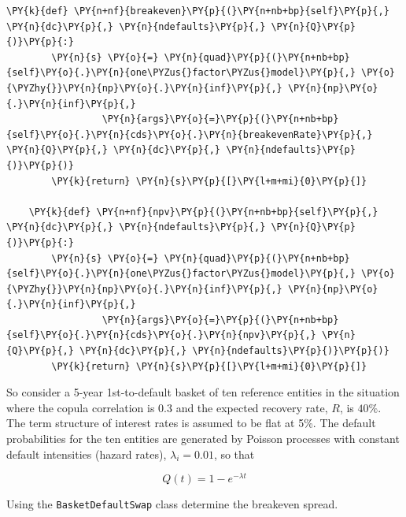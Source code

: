 \begin{tcolorbox}[breakable, size=fbox, boxrule=1pt, pad at break*=1mm,colback=cellbackground, colframe=cellborder]
\begin{Verbatim}[commandchars=\\\{\}]
    \PY{k}{def} \PY{n+nf}{breakeven}\PY{p}{(}\PY{n+nb+bp}{self}\PY{p}{,} \PY{n}{dc}\PY{p}{,} \PY{n}{ndefaults}\PY{p}{,} \PY{n}{Q}\PY{p}{)}\PY{p}{:}
        \PY{n}{s} \PY{o}{=} \PY{n}{quad}\PY{p}{(}\PY{n+nb+bp}{self}\PY{o}{.}\PY{n}{one\PYZus{}factor\PYZus{}model}\PY{p}{,} \PY{o}{\PYZhy{}}\PY{n}{np}\PY{o}{.}\PY{n}{inf}\PY{p}{,} \PY{n}{np}\PY{o}{.}\PY{n}{inf}\PY{p}{,} 
                 \PY{n}{args}\PY{o}{=}\PY{p}{(}\PY{n+nb+bp}{self}\PY{o}{.}\PY{n}{cds}\PY{o}{.}\PY{n}{breakevenRate}\PY{p}{,} \PY{n}{Q}\PY{p}{,} \PY{n}{dc}\PY{p}{,} \PY{n}{ndefaults}\PY{p}{)}\PY{p}{)}
        \PY{k}{return} \PY{n}{s}\PY{p}{[}\PY{l+m+mi}{0}\PY{p}{]}
		
    \PY{k}{def} \PY{n+nf}{npv}\PY{p}{(}\PY{n+nb+bp}{self}\PY{p}{,} \PY{n}{dc}\PY{p}{,} \PY{n}{ndefaults}\PY{p}{,} \PY{n}{Q}\PY{p}{)}\PY{p}{:}
        \PY{n}{s} \PY{o}{=} \PY{n}{quad}\PY{p}{(}\PY{n+nb+bp}{self}\PY{o}{.}\PY{n}{one\PYZus{}factor\PYZus{}model}\PY{p}{,} \PY{o}{\PYZhy{}}\PY{n}{np}\PY{o}{.}\PY{n}{inf}\PY{p}{,} \PY{n}{np}\PY{o}{.}\PY{n}{inf}\PY{p}{,} 
                 \PY{n}{args}\PY{o}{=}\PY{p}{(}\PY{n+nb+bp}{self}\PY{o}{.}\PY{n}{cds}\PY{o}{.}\PY{n}{npv}\PY{p}{,} \PY{n}{Q}\PY{p}{,} \PY{n}{dc}\PY{p}{,} \PY{n}{ndefaults}\PY{p}{)}\PY{p}{)}
        \PY{k}{return} \PY{n}{s}\PY{p}{[}\PY{l+m+mi}{0}\PY{p}{]}        
\end{Verbatim}
\end{tcolorbox}

So consider a 5-year 1st-to-default basket of ten
reference entities in the situation where the copula correlation is 0.3
and the expected recovery rate, \(R\), is \(40\%\). The term structure
of interest rates is assumed to be flat at 5\%. The default
probabilities for the ten entities are generated by Poisson processes
with constant default intensities (hazard rates), \(\lambda_i=0.01\), so that

\[ Q(t) = 1 - e^{-\lambda t} \]

Using the \texttt{BasketDefaultSwap} class determine the breakeven spread.


